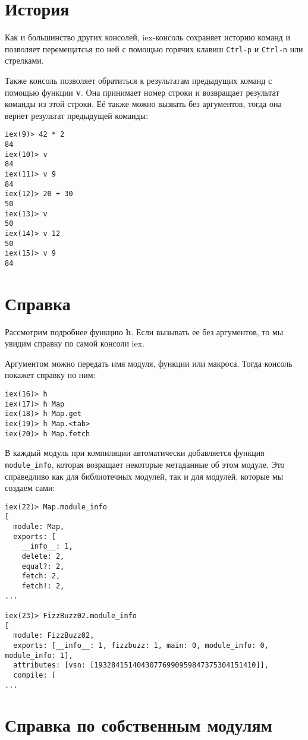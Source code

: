 \section{История}

Как и большинство других консолей, iex-консоль сохраняет историю команд и позволяет перемещатсья по ней с помощью горячих клавиш \texttt{Ctrl-p} и \texttt{Ctrl-n} или стрелками.

Также консоль позволяет обратиться к результатам предыдущих команд с помощью функции \textbf{v}. Она принимает номер строки и возвращает результат команды из этой строки. Её также можно вызвать без аргументов, тогда она вернет результат предыдущей команды:

\begin{lstlisting}
iex(9)> 42 * 2
84
iex(10)> v
84
iex(11)> v 9
84
iex(12)> 20 + 30
50
iex(13)> v
50
iex(14)> v 12
50
iex(15)> v 9
84
\end{lstlisting}

\section{Справка}

Рассмотрим подробнее функцию \textbf{h}. Если вызывать ее без аргументов, то мы увидим справку по самой консоли iex. 

Аргументом можно передать имя модуля, функции или макроса. Тогда консоль покажет справку по ним:
\begin{lstlisting}
iex(16)> h
iex(17)> h Map
iex(18)> h Map.get
iex(19)> h Map.<tab>
iex(20)> h Map.fetch
\end{lstlisting}

В каждый модуль при компиляции автоматически добавляется функция \texttt{module\_info}, которая возращает некоторые метаданные об этом модуле. Это справедливо как для библиотечных модулей, так и для модулей, которые мы создаем сами:

\begin{lstlisting}
iex(22)> Map.module_info
[
  module: Map,
  exports: [
    __info__: 1,
    delete: 2,
    equal?: 2,
    fetch: 2,
    fetch!: 2,
...

iex(23)> FizzBuzz02.module_info
[
  module: FizzBuzz02,
  exports: [__info__: 1, fizzbuzz: 1, main: 0, module_info: 0, module_info: 1],
  attributes: [vsn: [19328415140430776990959847375304151410]],
  compile: [
...
\end{lstlisting}


\section{Справка по собственным модулям}

